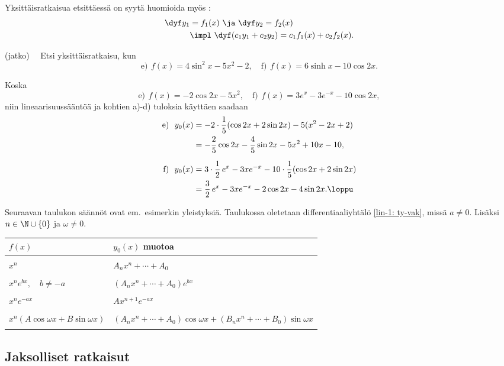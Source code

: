 Yksittäisratkaisua etsittäessä on syytä huomioida myös :
\begin{align*}
\dyf y_1 &= f_1(x) \ \ja \ \dyf y_2=f_2(x) \\
&\impl \ \dyf(c_1y_1+c_2y_2)=c_1f_1(x)+c_2f_2(x).
\end{align*}
\jatko \begin{Exa}
(jatko) \ \, Etsi yksittäisratkaisu, kun
\[
\text{e)}\,\ f(x)=4\sin^2 x-5x^2-2, \quad
\text{f)}\,\ f(x)=6\sinh x-10\cos 2x.
\]
\end{Exa}
\ratk Koska
\[
\text{e)}\,\ f(x)=-2\cos 2x-5x^2, \quad
\text{f)}\,\ f(x)=3e^x-3e^{-x}-10\cos 2x,
\]
niin lineaarisuussääntöä ja kohtien a)-d) tuloksia käyttäen saadaan
\begin{align*}
\text{e)}\ \ y_0(x) &= -2\cdot\frac{1}{5}(\cos 2x+2\sin 2x)-5(x^2-2x+2) \\
                    &= -\frac{2}{5}\cos 2x-\frac{4}{5}\sin 2x-5x^2+10x-10, \\[2mm]
\text{f)}\ \ y_0(x) &= 3\cdot\frac{1}{2}\,e^x-3xe^{-x}-10\cdot\frac{1}{5}(\cos 2x+2\sin 2x) \\
             &= \frac{3}{2}\,e^x-3xe^{-x}-2\cos 2x-4\sin 2x. \loppu
\end{align*}

Seuraavan taulukon säännöt ovat em.\ esimerkin yleistyksiä. Taulukossa oletetaan
differentiaaliyhtälö \eqref{lin-1: ty-vak}, missä
$a\neq 0$. Lisäksi $n\in\N\cup\{0\}$ ja $\omega\neq 0$.
\vspace{0.5cm} \newline
\begin{tabular}{|l|l|} \hline
$f(x)$ &$y_0(x)$ muotoa \\ \hline & \\
$x^n$ &$A_nx^n+\cdots + A_0$ \\ & \\
$x^ne^{bx}, \quad b\neq-a$ &$(A_nx^n+\cdots + A_0)e^{bx}$ \\ & \\
$x^ne^{-ax}$ &$Ax^{n+1}e^{-ax}$ \\ & \\
$x^n(A\cos \omega x + B\sin \omega x)$ &$(A_nx^n+\cdots + A_0)\cos \omega x 
                                                   + (B_nx^n+\cdots + B_0)\sin \omega x$ \\ 
& \\ \hline 
\end{tabular}

\subsection*{Jaksolliset ratkaisut}

